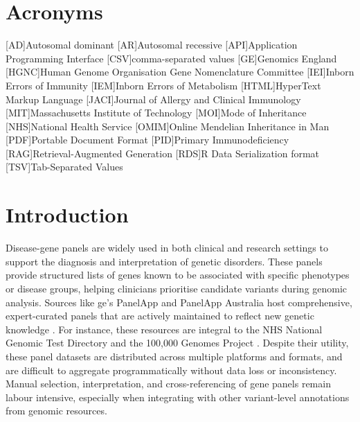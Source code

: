 \section*{Acronyms}
\renewenvironment{description} %
{\list{}{\labelwidth0pt\itemindent-\leftmargin
    \parsep-1em\itemsep0pt\let\makelabel\descriptionlabel}}
               {\endlist}
\begin{acronym} 
[AD]{Autosomal dominant}
[AR]{Autosomal recessive}
[API]{Application Programming Interface}
[CSV]{comma-separated values}
[GE]{Genomics England}
[HGNC]{Human Genome Organisation Gene Nomenclature Committee}
[IEI]{Inborn Errors of Immunity}
[IEM]{Inborn Errors of Metabolism}
[HTML]{HyperText Markup Language}
[JACI]{Journal of Allergy and Clinical Immunology}
[MIT]{Massachusetts Institute of Technology}
[MOI]{Mode of Inheritance}
[NHS]{National Health Service}
[OMIM]{Online Mendelian Inheritance in Man}
[PDF]{Portable Document Format}
[PID]{Primary Immunodeficiency}
[RAG]{Retrieval-Augmented Generation}
[RDS]{R Data Serialization format}
[TSV]{Tab-Separated Values}
\end{acronym} 
 

\section{Introduction}
\noindent
Disease-gene panels are widely used in both clinical and research settings to support the diagnosis and interpretation of genetic disorders. 
These panels provide structured lists of genes known to be associated with specific phenotypes or disease groups, helping clinicians prioritise candidate variants during genomic analysis. 
Sources like \ac{ge}’s PanelApp and PanelApp Australia host comprehensive, expert-curated panels that are actively maintained to reflect new genetic knowledge \cite{martin_panelapp_2019}. 
For instance, these resources are integral to the NHS National Genomic Test Directory and the 100,000 Genomes Project \cite{martin_panelapp_2019}. 
Despite their utility, these panel datasets are distributed across multiple platforms and formats, and are difficult to aggregate programmatically without data loss or inconsistency. 
Manual selection, interpretation, and cross-referencing of gene panels remain labour intensive, especially when integrating with other variant-level annotations from genomic resources. 

